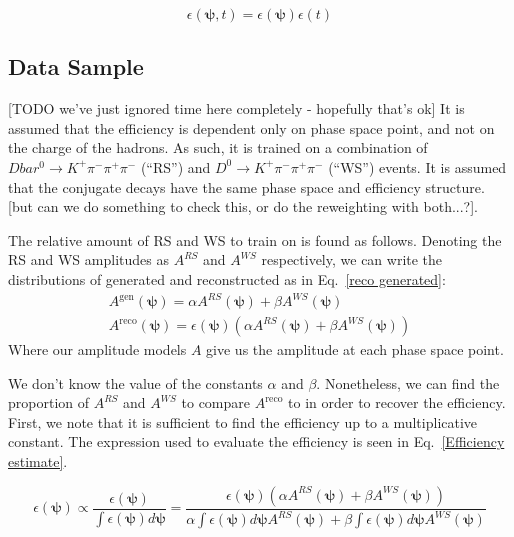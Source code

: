 \documentclass[note.tex]{subfiles}
\begin{document}
\begin{equation}
    \epsilon(\mathbf{\psi}, t) = \epsilon(\mathbf{\psi}) \epsilon(t)
    \label{efficiency split}
\end{equation}

\subsection{Data Sample}
[TODO we've just ignored time here completely - hopefully that's ok]
It is assumed that the efficiency is dependent only on phase space point, and not on the charge of the hadrons.
As such, it is trained on a combination of $Dbar^0 \rightarrow K^+ \pi^- \pi^+ \pi^-$ (``RS'') and $D^0 \rightarrow K^+ \pi^- \pi^+ \pi^-$ (``WS'') events.
It is assumed that the conjugate decays have the same phase space and efficiency structure. [but can we do something to check this, or do the reweighting with both...?].

The relative amount of RS and WS to train on is found as follows.
Denoting the RS and WS amplitudes as $A^{RS}$ and $A^{WS}$ respectively, we can write the distributions of generated and reconstructed as in Eq.~\ref{reco generated}:
\begin{equation}
    \begin{aligned}
        A^{\mathrm{gen}}(\mathbf{\psi}) = \alpha A^{RS}(\mathbf{\psi}) + \beta A^{WS}(\mathbf{\psi})\quad \\
        A^{\mathrm{reco}}(\mathbf{\psi}) = \epsilon(\mathbf{\psi})(\alpha A^{RS}(\mathbf{\psi}) + \beta A^{WS}(\mathbf{\psi}))
    \end{aligned}
    \label{reco generated}
\end{equation}
Where our amplitude models $A$ give us the amplitude at each phase space point.

We don't know the value of the constants $\alpha$ and $\beta$.
Nonetheless, we can find the proportion of $A^{RS}$ and $A^{WS}$ to compare $A^\mathrm{reco}$ to in order to recover the efficiency.
First, we note that it is sufficient to find the efficiency up to a multiplicative constant.
The expression used to evaluate the efficiency is seen in Eq.~\ref{Efficiency estimate}.

\begin{equation}
        \epsilon(\mathbf{\psi}) \propto \frac{\epsilon(\mathbf{\psi})}{\int \epsilon(\mathbf{\psi}) d\mathbf{\psi}} = \frac{\epsilon(\mathbf{\psi})(\alpha A^{RS}(\mathbf{\psi}) + \beta A^{WS}(\mathbf{\psi}))}{\alpha \int \epsilon(\mathbf{\psi}) d\mathbf{\psi}A^{RS}(\mathbf{\psi}) + \beta \int \epsilon(\mathbf{\psi}) d\mathbf{\psi}A^{WS}(\mathbf{\psi})}
    \label{Efficiency estimate}
\end{equation}
\end{document}
